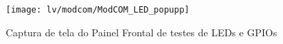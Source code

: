         \begin{figure}
                \centering
                 \texttt{[image: lv/modcom/ModCOM\_LED\_popupp]}
                \caption{Captura de tela do Painel Frontal de testes de LEDs e GPIOs}
                \label{fig:modcomledp}
        \end{figure}

        
